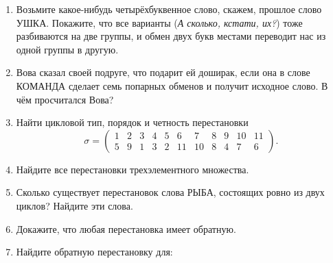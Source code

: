 \begin{enumerate}
    \item Возьмите какое-нибудь четырёхбуквенное слово, скажем, прошлое слово \textsf{УШКА}.
        Покажите, что все варианты (\emph{А сколько, кстати, их?}) тоже разбиваются на две группы,
        и обмен двух букв местами переводит нас из одной группы в другую.
    \item Вова сказал своей подруге, что подарит ей доширак,
        если она в слове \textsf{КОМАНДА} сделает семь попарных обменов и получит исходное слово.
        В чём просчитался Вова?
    \item Найти цикловой тип, порядок и четность перестановки
        \[
            \sigma = \begin{pmatrix}
                1 & 2 & 3 & 4 & 5 & 6 & 7 & 8 & 9 & 10 & 11 \\
                5 & 9 & 1 & 3 & 2 & 11 & 10 & 8 & 4 & 7 & 6
            \end{pmatrix}.
        \]
    \item Найдите все перестановки трехэлементного множества.
    \item Сколько существует перестановок слова \textsf{РЫБА}, состоящих ровно
        из двух циклов? Найдите эти слова.
    \item Докажите, что любая перестановка имеет обратную.
    \item Найдите обратную перестановку для: 


\end{enumerate}
